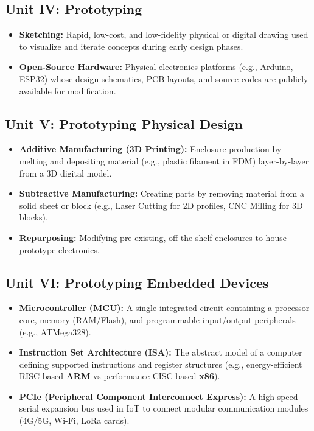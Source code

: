 \subsection{Unit IV: Prototyping}
\begin{itemize}
  \item   \textbf{Sketching:} Rapid, low-cost, and low-fidelity physical or digital drawing used to visualize and iterate concepts during early design phases.
  \item   \textbf{Open-Source Hardware:} Physical electronics platforms (e.g., Arduino, ESP32) whose design schematics, PCB layouts, and source codes are publicly available for modification.
\end{itemize}

\subsection{Unit V: Prototyping Physical Design}
\begin{itemize}
  \item   \textbf{Additive Manufacturing (3D Printing):} Enclosure production by melting and depositing material (e.g., plastic filament in FDM) layer-by-layer from a 3D digital model.
  \item   \textbf{Subtractive Manufacturing:} Creating parts by removing material from a solid sheet or block (e.g., Laser Cutting for 2D profiles, CNC Milling for 3D blocks).
  \item   \textbf{Repurposing:} Modifying pre-existing, off-the-shelf enclosures to house prototype electronics.
\end{itemize}

\subsection{Unit VI: Prototyping Embedded Devices}
\begin{itemize}
  \item   \textbf{Microcontroller (MCU):} A single integrated circuit containing a processor core, memory (RAM/Flash), and programmable input/output peripherals (e.g., ATMega328).
  \item   \textbf{Instruction Set Architecture (ISA):} The abstract model of a computer defining supported instructions and register structures (e.g., energy-efficient RISC-based \textbf{ARM} vs performance CISC-based \textbf{x86}).
  \item   \textbf{PCIe (Peripheral Component Interconnect Express):} A high-speed serial expansion bus used in IoT to connect modular communication modules (4G/5G, Wi-Fi, LoRa cards).
\end{itemize}

